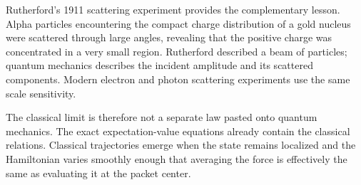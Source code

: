 Rutherford's 1911 scattering experiment provides the complementary lesson. Alpha particles encountering the compact charge distribution of a gold nucleus were scattered through large angles, revealing that the positive charge was concentrated in a very small region. Rutherford described a beam of particles; quantum mechanics describes the incident amplitude and its scattered components. Modern electron and photon scattering experiments use the same scale sensitivity.

\begin{classroomqa}
\end{classroomqa}

The classical limit is therefore not a separate law pasted onto quantum mechanics. The exact expectation-value equations already contain the classical relations. Classical trajectories emerge when the state remains localized and the Hamiltonian varies smoothly enough that averaging the force is effectively the same as evaluating it at the packet center.
